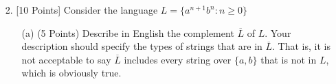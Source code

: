\documentclass[12pt]{article}
\begin{document}
\begin{spacing}{1.5}
\begin{enumerate}
\begin{enumerate}
                              \newpage
                        \item[(d)] (5 Points) $L_d = \{w \in \{a,b\}^* : w \neq xx, \text{ for any } x \in \{a,b\}^* \}$

                              $S \rightarrow X | Y$ \\
                              $X \rightarrow aXa | bXb | aXb | bXa | a | b$ \\
                              $Y \rightarrow aYa | bYb | aYb | bYa | aY_1a | bY_2b | aY_3b | bY_4a$ \\
                              $Y_1 \rightarrow bZb | aZb | bZa$ \\
                              $Y_2 \rightarrow aZa | aZb | bZa$ \\
                              $Y_3 \rightarrow aZa | bZb | aZb | \lambda$ \\
                              $Y_4 \rightarrow aZa | bZb | bZa | \lambda$ \\
                              $Z \rightarrow aZa | bZb | aZb | bZa | \lambda$

                  \end{enumerate}

                  \newpage
            \item[2.] [10 Points] Consider the language $L=\{a^{n+1}b^n : n \geq 0 \}$

                  \begin{enumerate}
                        \item[(a)] (5 Points) Describe in English the complement $\overline{L}$ of $L$. Your description should specify the types of strings that are in $\overline{L}$. That is, it is not acceptable to say $\overline{L}$ includes every string over $\{a,b \}$ that is not in $L$, which is obviously true.


\end{enumerate}
\end{enumerate}
\end{spacing}
\end{document}
